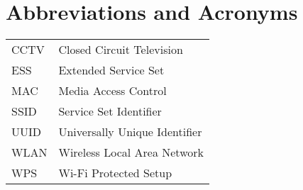 \chapter*{Abbreviations and Acronyms}


\noindent
\begin{longtable}{@{}p{}p{}@{}}
CCTV & Closed Circuit Television \\
ESS & Extended Service Set \\
MAC & Media Access Control \\
SSID & Service Set Identifier \\
UUID & Universally Unique Identifier \\
WLAN & Wireless Local Area Network \\
WPS & Wi-Fi Protected Setup \\
\end{longtable}

